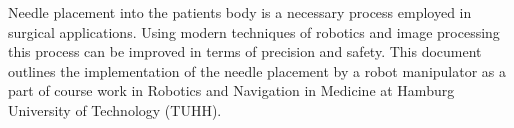 Needle placement into the patients body is a necessary process employed in surgical applications.
Using modern techniques of robotics and image processing this process can be improved in terms of precision and safety.
This document outlines the implementation of the needle placement by a robot manipulator as a part of course work in Robotics and Navigation in Medicine at Hamburg University of Technology (TUHH).